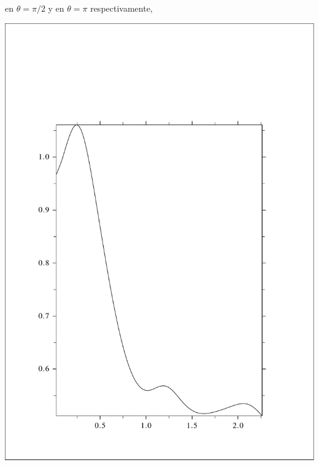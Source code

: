\documentclass [11pt,spanish]{article}
\begin{document}
en $\theta=\pi/2$ y en $\theta=\pi$ respectivamente,

\includegraphics[scale=0.4]{RES_2s_tt2abspi2.pdf}
\end{document}
